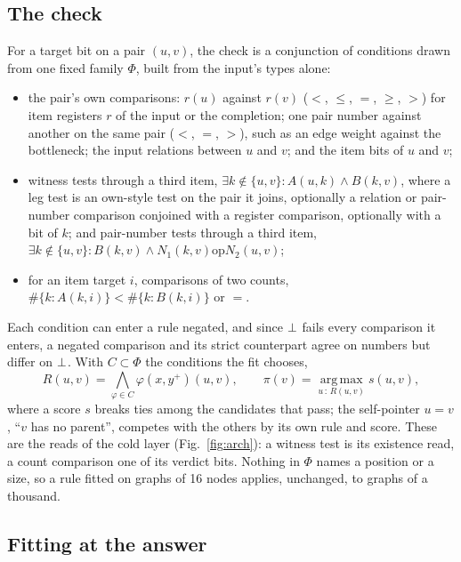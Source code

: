 \subsection{The check}

For a target bit on a pair $(u,v)$, the check is a conjunction of conditions drawn from one fixed family $\Phi$, built
from the input's types alone:
\begin{itemize}
\setlength{\itemsep}{0pt}
\item the pair's own comparisons: $r(u)$ against $r(v)$ ($<$, $\leq$, $=$, $\geq$, $>$) for item registers $r$ of the input
or the completion; one pair number against another on the same pair ($<$, $=$, $>$), such as an edge weight against the
bottleneck; the input relations between $u$ and $v$; and the item bits of $u$ and $v$;
\item witness tests through a third item, $\exists k \notin \{u,v\} : A(u,k) \wedge B(k,v)$, where a leg test is an
own-style test on the pair it joins, optionally a relation or pair-number comparison conjoined with a register
comparison, optionally with a bit of $k$; and pair-number tests through a third item, $\exists k \notin \{u,v\} :
B(k,v) \wedge N_1(k,v) \mathbin{\mathrm{op}} N_2(u,v)$;
\item for an item target $i$, comparisons of two counts, $\#\{k : A(k,i)\} < \#\{k : B(k,i)\}$ or $=$.
\end{itemize}
Each condition can enter a rule negated, and since $\bot$ fails every comparison it enters, a negated comparison and
its strict counterpart agree on numbers but differ on $\bot$. With $C \subset \Phi$ the conditions the fit chooses,
\begin{equation}
R(u,v) = \bigwedge_{\varphi \in C} \varphi(x, y^{+})(u,v), \qquad
\pi(v) = \operatorname*{arg\,max}_{u \,:\, R(u,v)} s(u,v),
\label{eq:check}
\end{equation}
where a score $s$ breaks ties among the candidates that pass; the self-pointer $u = v$, ``$v$ has no parent'', competes
with the others by its own rule and score. These are the reads of the cold layer (Fig.~\ref{fig:arch}): a witness test is
its existence read, a count comparison one of its verdict bits\cite{mohsenvand2026zero}. Nothing in $\Phi$ names a
position or a size, so a rule fitted on graphs of 16 nodes applies, unchanged, to graphs of a thousand.

\subsection{Fitting at the answer}

